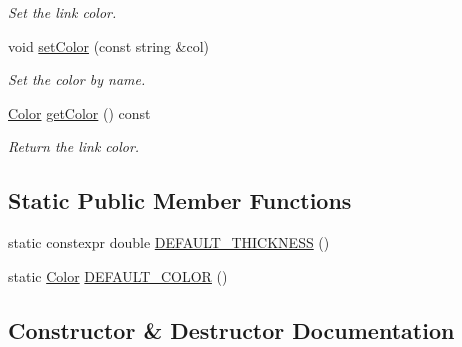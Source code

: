 \begin{DoxyCompactItemize}
\begin{DoxyCompactList}\small\item\em Set the link color. \end{DoxyCompactList}\item 
void \hyperlink{classbridges_1_1datastructure_1_1_link_visualizer_af570ade2d50a8789db3b06b79e5dc589}{set\+Color} (const string \&col)
\begin{DoxyCompactList}\small\item\em Set the color by name. \end{DoxyCompactList}\item 
\hyperlink{classbridges_1_1datastructure_1_1_color}{Color} \hyperlink{classbridges_1_1datastructure_1_1_link_visualizer_aeeecf856414fc894b9764e66aef614e1}{get\+Color} () const
\begin{DoxyCompactList}\small\item\em Return the link color. \end{DoxyCompactList}\end{DoxyCompactItemize}
\subsection*{Static Public Member Functions}
\begin{DoxyCompactItemize}
\item 
static constexpr double \hyperlink{classbridges_1_1datastructure_1_1_link_visualizer_a3b23cb9f5ab2dd564fcc4d974e3753f8}{D\+E\+F\+A\+U\+L\+T\+\_\+\+T\+H\+I\+C\+K\+N\+E\+SS} ()
\item 
static \hyperlink{classbridges_1_1datastructure_1_1_color}{Color} \hyperlink{classbridges_1_1datastructure_1_1_link_visualizer_aa42e1a41ab0332c2e50e1a21068b2533}{D\+E\+F\+A\+U\+L\+T\+\_\+\+C\+O\+L\+OR} ()
\end{DoxyCompactItemize}


\subsection{Constructor \& Destructor Documentation}
\mbox{\label{classbridges_1_1datastructure_1_1_link_visualizer_ae910a1d6f13a3807b025c2c94231d7c8}} 
